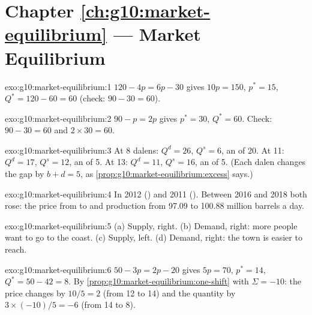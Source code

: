 \section*{Chapter \ref{ch:g10:market-equilibrium} --- Market Equilibrium}

\begin{solution}{exo:g10:market-equilibrium:1}
$120 - 4p = 6p - 30$ gives $10p = 150$, $p^* = 15$, $Q^* = 120 - 60 = 60$ (check: $90 - 30 = 60$).
\end{solution}

\begin{solution}{exo:g10:market-equilibrium:2}
$90 - p = 2p$ gives $p^* = 30$, $Q^* = 60$. Check: $90 - 30 = 60$ and $2 \times 30 = 60$.
\end{solution}

\begin{solution}{exo:g10:market-equilibrium:3}
At 8 dalens: $Q^d = 26$, $Q^s = 6$, an  of 20. At 11: $Q^d = 17$, $Q^s = 12$, an  of 5. At 13: $Q^d = 11$, $Q^s =
16$, an  of 5. (Each dalen changes the gap by $b + d = 5$, as \cref{prop:g10:market-equilibrium:excess} says.)
\end{solution}

\begin{solution}{exo:g10:market-equilibrium:4}
In 2012 () and 2011 (). Between 2016 and 2018 both rose: the price from  to  and production from 97.09 to
100.88 million barrels a day.
\end{solution}

\begin{solution}{exo:g10:market-equilibrium:5}
(a) Supply, right. (b) Demand, right: more people want to go to the coast. (c) Supply, left. (d) Demand, right: the town is easier to reach.
\end{solution}

\begin{solution}{exo:g10:market-equilibrium:6}
$50 - 3p = 2p - 20$ gives $5p = 70$, $p^* = 14$, $Q^* = 50 - 42 = 8$. By \cref{prop:g10:market-equilibrium:one-shift} with $\Sigma = -10$: the price
changes by $10/5 = 2$ (from 12 to 14) and the quantity by $3 \times (-10)/5 = -6$ (from 14 to 8).
\end{solution}

